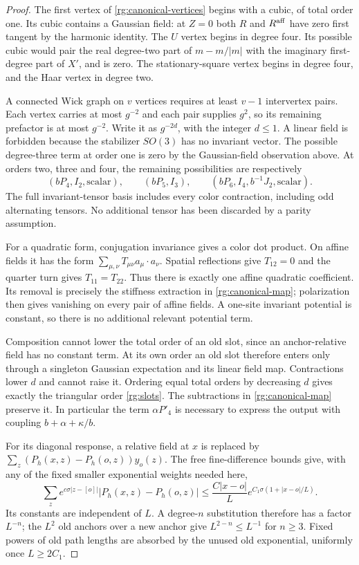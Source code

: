 \begin{proof}
The first vertex of \eqref{rg:canonical-vertices} begins with a cubic,
of total order one.  Its cubic contains a Gaussian field: at $Z=0$
both $R$ and $R^{\rm aff}$ have zero first tangent by the harmonic
identity.  The $U$ vertex begins in degree four.  Its possible cubic
would pair the real degree-two part of $m-m/|m|$ with the imaginary
first-degree part of $X'$, and is zero.  The stationary-square
vertex begins in degree four, and the Haar vertex in degree two.

A connected Wick graph on $v$ vertices requires at least $v-1$
intervertex pairs.  Each vertex carries at most $g^{-2}$ and each
pair supplies $g^2$, so its remaining prefactor is at most $g^{-2}$.
Write it as $g^{-2d}$, with the integer $d\le1$.  A linear field is
forbidden because the stabilizer $SO(3)$ has no invariant vector.
The possible degree-three term at order one is zero by the
Gaussian-field observation above.  At orders two, three and four,
the remaining possibilities are respectively
\[
 (bP_4,I_2,\text{scalar}),\qquad
 (bP_5,I_3),\qquad
 (bP_6,I_4,b^{-1}J_2,\text{scalar}).
\]
The full invariant-tensor basis includes every color contraction,
including odd alternating tensors.  No additional tensor has been
discarded by a parity assumption.

For a quadratic form, conjugation invariance gives a color dot
product.  On affine fields it has the form
$\sum_{\mu,\nu}T_{\mu\nu}a_\mu\cdot a_\nu$.
Spatial reflections give $T_{12}=0$ and the quarter turn gives
$T_{11}=T_{22}$.  Thus there is exactly one affine quadratic
coefficient.  Its removal is precisely the stiffness extraction
in \eqref{rg:canonical-map}; polarization then gives vanishing on
every pair of affine fields.  A one-site invariant potential is
constant, so there is no additional relevant potential term.

Composition cannot lower the total order of an old slot, since an
anchor-relative field has no constant term.  At its own order an
old slot therefore enters only through a singleton Gaussian
expectation and its linear field map.  Contractions lower $d$ and
cannot raise it.  Ordering equal total orders by decreasing $d$
gives exactly the triangular order \eqref{rg:slots}.  The
subtractions in \eqref{rg:canonical-map} preserve it.  In particular
the term $\alpha P'_4$ is necessary to express the output with
coupling $b+\alpha+\kappa/b$.

For its diagonal response, a relative field at $x$ is replaced by
$\sum_z(P_h(x,z)-P_h(o,z))y_o(z)$.  The free fine-difference bounds
give, with any of the fixed smaller exponential weights needed here,
\begin{equation}
 \sum_z e^{c\sigma|z-[o]|}|P_h(x,z)-P_h(o,z)|
 \le \frac{C|x-o|}{L}
                     e^{C_1\sigma(1+|x-o|/L)}.
 \label{rg:row-difference}
\end{equation}
Its constants are independent of $L$.  A degree-$n$ substitution
therefore has a factor $L^{-n}$; the $L^2$ old anchors over a new
anchor give $L^{2-n}\le L^{-1}$ for $n\ge3$.  Fixed powers of old
path lengths are absorbed by the unused old exponential, uniformly
once $L\ge2C_1$.


\end{proof}
